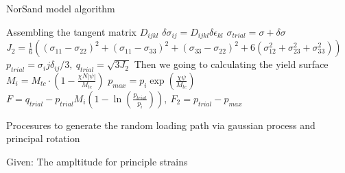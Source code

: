 \documentclass{article}
\begin{document}
	\begin{algorithm}
		\caption{NorSand model algorithm}
		\begin{algorithmic}[1]
			\State Assembling the tangent matrix $ D_{ijkl}$
			\State $ \delta\sigma_{ij} = D_{ijkl} \delta\epsilon_{kl}$
			\State $\sigma_{trial}=\sigma+\delta\sigma$ 
			\State $J_2=\frac{1}{6}((\sigma_{11}-\sigma_{22})^2+(\sigma_{11}-\sigma_{33})^2+(\sigma_{33}-\sigma_{22})^2+6(\sigma_{12}^{2}+\sigma_{23}^{2}+\sigma_{33}^{2}))$
			\State $p_{trial} = \sigma_ij\delta_{ij}/3, \ q_{trial}=\sqrt{3J_2}$
			\State Then we going to calculating the yield surface
			\State $M_i=M_{tc}\cdot(1-\frac{\chi N | \psi |}{M_{tc}})$
			\State $ p_{max}=p_i\exp{(\frac{\chi\psi}{M_{tc}})}$
			\State $F=q_{trial}-p_{trial}M_i(1-\ln(\frac{p_{trial}}{p_{i}})), 
			\ F_2=p_{trial}-p_{max}$
		\end{algorithmic}
	\end{algorithm}

\begin{algorithm}	
	\begin{algorithmic}[1]
		\caption{Procesures to generate the random loading path via gaussian process and principal rotation}
		\Require Given: The ampltitude for principle strains 
		
	\end{algorithmic}
\end{algorithm}
	
\end{document}
